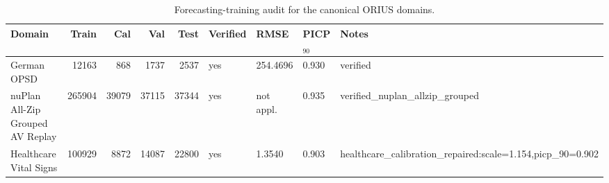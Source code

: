 \begin{table}[htbp]
\centering
\caption{Forecasting-training audit for the canonical ORIUS domains.}
\label{tab:domain-training-audit}
\begin{tabular}{lrrrrllll}
\toprule
Domain & Train & Cal & Val & Test & Verified & RMSE & PICP$_{90}$ & Notes \\
\midrule
German OPSD & 12163 & 868 & 1737 & 2537 & yes & 254.4696 & 0.930 & verified \\
nuPlan All-Zip Grouped AV Replay & 265904 & 39079 & 37115 & 37344 & yes & not appl. & 0.935 & verified\_nuplan\_allzip\_grouped \\
Healthcare Vital Signs & 100929 & 8872 & 14087 & 22800 & yes & 1.3540 & 0.903 & healthcare\_calibration\_repaired:scale=1.154,picp\_90=0.902 \\
\bottomrule
\end{tabular}
\end{table}
